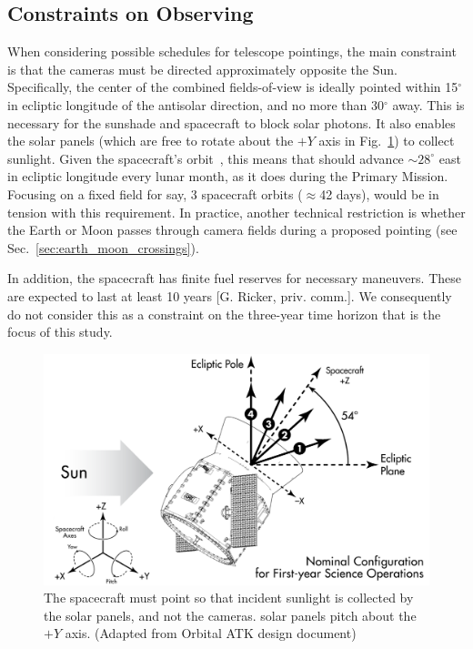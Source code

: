 \subsection{Constraints on \tesss Observing}
\label{sec:constraints_on_pointings}

When considering possible schedules for telescope pointings, the main
constraint is that the cameras must be directed approximately opposite
the Sun.  Specifically, the center of the combined fields-of-view is
ideally pointed within 15$^\circ$ in ecliptic longitude of the antisolar 
direction, and no more than 30$^\circ$ away.
This is necessary for the sunshade and spacecraft to block solar
photons.  It also enables the solar panels (which are free to rotate
about the $+Y$ axis in Fig.~\ref{fig:spacecraft_angles}) to collect
sunlight.  Given the spacecraft's orbit~\citep{gangestad_high_2013},
this means that \tess should advance $\sim$$28^\circ$ east in ecliptic
longitude every lunar month, as it does during the Primary Mission.
Focusing on a fixed field for say, 3 spacecraft orbits ($\approx$42
days), would be in tension with this requirement.  In practice,
another technical restriction is whether the Earth or Moon passes
through \tesss camera fields during a proposed pointing (see
Sec.~\ref{sec:earth_moon_crossings}).

In addition, the spacecraft has finite fuel reserves for necessary maneuvers.
These are expected to last at least 10 years [G. Ricker, priv. comm.]. We 
consequently do not consider this as a constraint on the three-year time 
horizon that is the focus of this study.

\begin{figure}[!b]
	\centering
	\includegraphics{figures/spacecraft_angles.pdf}
	\caption{The spacecraft must point so that incident sunlight is collected 
		by the solar panels, and not the cameras. \tesss solar panels pitch 
		about the $+Y$ axis. (Adapted from Orbital ATK design document) }
	\label{fig:spacecraft_angles}
\end{figure}
